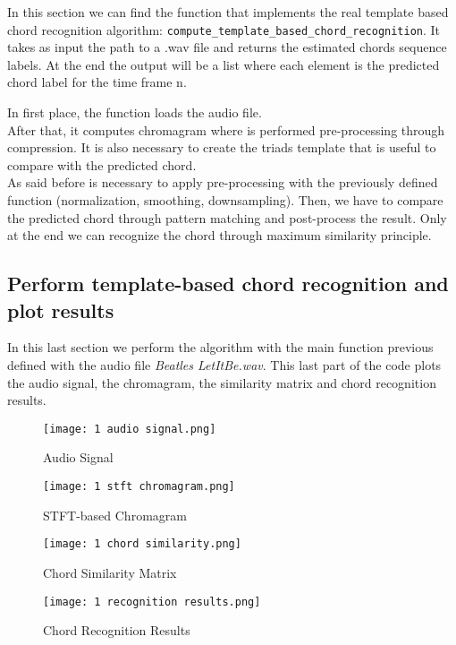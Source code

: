 \documentclass{article}
\begin{document}
In this section we can find the function that implements the real template based chord recognition algorithm: \verb |compute_template_based_chord_recognition|.
It takes as input the path to a .wav file and returns the estimated chords sequence labels.
At the end the output will be a list where each element is the predicted chord label for the time frame n.

In first place, the function loads the audio file.\\ After that, it computes chromagram where is performed pre-processing through compression. It is also necessary to create the triads template that is useful to compare with the predicted chord.\\
As said before is necessary to apply pre-processing with the previously defined function (normalization, smoothing, downsampling).
Then, we have to compare the predicted chord through pattern matching and post-process the result.
Only at the end we can recognize the chord through maximum similarity principle.\\

\subsection*{Perform template-based chord recognition and plot results}

In this last section we perform the algorithm with the main function previous defined with the audio file \emph{Beatles LetItBe.wav}. This last part of the code plots the audio signal, the chromagram, the similarity matrix and chord recognition results.

\begin{figure}[H]
 \centering
 \texttt{[image: 1 audio signal.png]}
 \caption{Audio Signal}
\end{figure}

\begin{figure}[H]
 \centering
 \texttt{[image: 1 stft chromagram.png]}
 \caption{STFT-based Chromagram}
\end{figure}

\begin{figure}[H]
 \centering
 \texttt{[image: 1 chord similarity.png]}
 \caption{Chord Similarity Matrix}
\end{figure}

\begin{figure}[H]
 \centering
 \texttt{[image: 1 recognition results.png]}
 \caption{Chord Recognition Results}
\end{figure}
\end{document}
